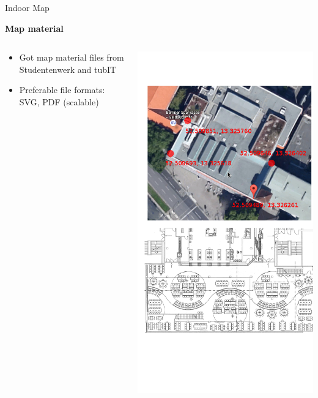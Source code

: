 \documentclass[11pt]{beamer}
\begin{document}
\begin{frame}{Indoor Map}

\textbf{Map material}

  \begin{columns}[T]
  \begin{column}{.6\textwidth}
  \begin{itemize}
    \item Got map material files from Studentenwerk and tubIT
    \item Preferable file formats: SVG, PDF (scalable)
  \end{itemize}
  \end{column}
  \begin{column}{.4\textwidth}
    \includegraphics[scale=0.25]{mensaplan}
  \end{column}
\end{columns}

\end{frame}
\end{document}
